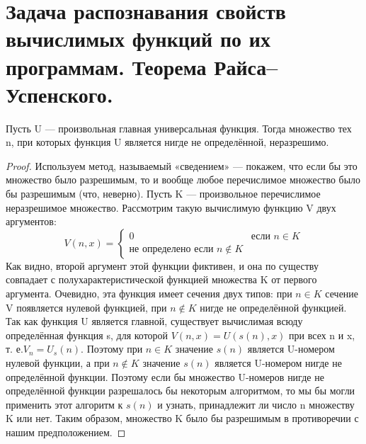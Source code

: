 \section{Задача распознавания свойств вычислимых функций по их программам. Теорема Райса–Успенского.}

\begin{theorem}
Пусть U — произвольная главная универсальная функция. Тогда множество тех n, при которых функция U является нигде
	не определённой, неразрешимо.
\end{theorem}
\begin{proof}
Используем метод, называемый «сведением» — покажем, что если бы это множество было разрешимым, то и вообще любое
	перечислимое множество было бы разрешимым (что, неверно). Пусть K — произвольное перечислимое неразрешимое
	множество. Рассмотрим такую вычислимую функцию V двух аргументов:
\begin{equation*}
V(n,x) = 
 \begin{cases}
   0 &\text{если $n \in K$}\\
   \text{не определено если $n \notin K$}
 \end{cases}
\end{equation*} 
Как видно, второй аргумент этой функции фиктивен, и она по существу совпадает с полухарактеристической функцией
	множества K от первого аргумента. Очевидно, эта функция имеет сечения двух типов: при $n \in K$ сечение V
	появляется нулевой функцией, при $n \notin K$ нигде не определённой функцией. Так как функция U является
	главной, существует вычислимая всюду определённая функция s, для которой $V(n,x) = U(s(n),x)$ при всех n и x,
	т. е.$V_n = U_s(n)$. Поэтому при $n \in K$ значение $s(n)$ является U-номером нулевой функции, а при $n \notin
	K$ значение $s(n)$ является U-номером нигде не определённой функции. Поэтому если бы множество U-номеров нигде
	не определённой функции разрешалось бы некоторым алгоритмом, то мы бы могли применить этот алгоритм к $s(n)$ и
	узнать, принадлежит ли число n множеству K или нет. Таким образом, множество K было бы разрешимым в
	противоречии с нашим предположением.
\end{proof}

